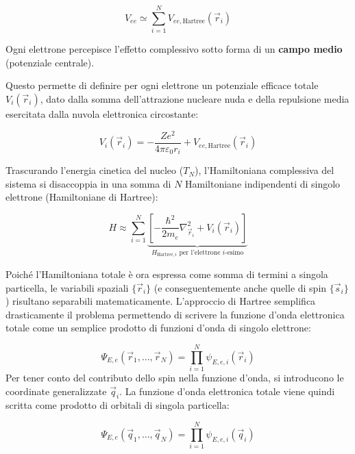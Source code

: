 \begin{equation}
    V_{ee} \simeq \sum_{i=1}^{N} V_{ee,\text{Hartree}}(\vec{r}_i)
\end{equation}

Ogni elettrone percepisce l'effetto complessivo sotto forma di un \textbf{campo medio} (potenziale centrale). 

Questo permette di definire per ogni elettrone un potenziale efficace totale \( V_i(\vec{r}_i) \), dato dalla somma dell'attrazione nucleare nuda e della repulsione media esercitata dalla nuvola elettronica circostante:

\begin{equation}
    V_i(\vec{r}_i) = -\frac{Ze^2}{4\pi\varepsilon_0 r_i} + V_{ee,\text{Hartree}}(\vec{r}_i)
\end{equation}

Trascurando l'energia cinetica del nucleo (\( T_N \)), l'Hamiltoniana complessiva del sistema si disaccoppia in una somma di \( N \) Hamiltoniane indipendenti di singolo elettrone (Hamiltoniane di Hartree):

\begin{equation}
    H \approx \sum_{i=1}^{N} \underbrace{\left[ -\frac{\hbar^2}{2m_e} \nabla_{\vec{r}_i}^2 + V_i(\vec{r}_i) \right]}_{H_{\text{Hartree}, i} \text{ per l'elettrone } i\text{-esimo}}
\end{equation}

Poiché l'Hamiltoniana totale è ora espressa come somma di termini a singola particella, le variabili spaziali \( \{ \vec{r}_i \} \) (e conseguentemente anche quelle di spin \( \{ \vec{s}_i \} \)) risultano separabili matematicamente. L'approccio di Hartree semplifica drasticamente il problema permettendo di scrivere la funzione d'onda elettronica totale come un semplice prodotto di funzioni d'onda di singolo elettrone:

\begin{equation}
    \Psi_{E,e}(\vec{r}_1, \dots, \vec{r}_N) = \prod_{i=1}^{N} \psi_{E,e,i}(\vec{r}_i)
\end{equation}
Per tener conto del contributo dello spin nella funzione d'onda, si introducono le coordinate generalizzate \( \vec{q}_i \). La funzione d'onda elettronica totale viene quindi scritta come prodotto di orbitali di singola particella:

\begin{equation}
    \Psi_{E,e}(\vec{q}_1, \dots, \vec{q}_N) = \prod_{i=1}^{N} \psi_{E,e,i}(\vec{q}_i)
\end{equation}

